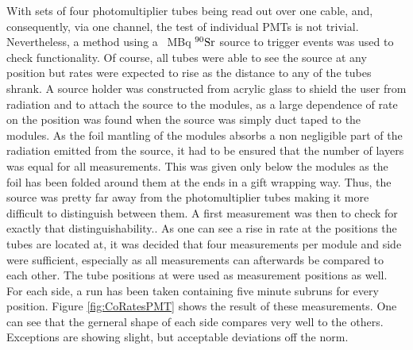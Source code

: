   With sets of four photomultiplier tubes being read out over one cable, and, consequently, via one channel, the test of individual PMTs is not trivial. Nevertheless, a method using a \SI{}{\mega\becquerel} $\rm ^{90}Sr$ source to trigger events was used to check functionality. Of course, all tubes were able to see the source at any position but rates were expected to rise as the distance to any of the tubes shrank. A source holder was constructed from acrylic glass to shield the user from radiation and to attach the source to the modules, as a large dependence of rate on the position was found when the source was simply duct taped to the modules. As the foil mantling of the modules absorbs a non negligible part of the radiation emitted from the source, it had to be ensured that the number of layers was equal for all measurements. This was given only below the modules as the foil has been folded around them at the ends in a gift wrapping way. Thus, the source was pretty far away from the photomultiplier 
tubes making it more difficult to distinguish between them. A first measurement was then to check for exactly that distinguishability..
  As one can see a rise in rate at the positions the tubes are located at, it was decided that four measurements per module and side were sufficient, especially as all measurements can afterwards be compared to each other.
  The tube positions at  were used as measurement positions as well. For each side, a run has been taken containing five minute subruns for every position. Figure \ref{fig:CoRatesPMT} shows the result of these measurements. One can see that the gerneral shape of each side compares very well to the others. Exceptions are showing slight, but acceptable deviations off the norm.
